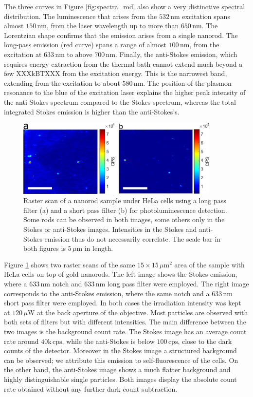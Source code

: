 \documentclass[journal=nalefd,manuscript=letter]{achemso}
\newcommand{\nm}{\ensuremath{\,\textrm{nm}}}
\newcommand{\um}{\ensuremath{\,\mu\textrm{m}}}
\newcommand{\uW}{\ensuremath{\,\mu\textrm{W}}}
\newcommand{\CPS}{\ensuremath{\,\textrm{cps}}}
\begin{document}
The three curves in Figure \ref{fig:spectra_rod} also show a very distinctive
spectral distribution. The luminescence that arises from the $532\nm$
excitation spans almost $150\nm$, from the laser wavelength up to
more than $650\nm$. The Lorentzian shape confirms that the emission arises from a single
nanorod. The long-pass emission (red curve) spans a range of
almost $100\nm$, from the excitation at $633\nm$ to above $700\nm$. Finally, the
anti-Stokes emission, which requires energy extraction from the thermal bath cannot extend much beyond a few XXXkBTXXX from the excitation energy.
This is the narrowest band, extending from the excitation to about $580\nm$.
The position of the plasmon resonance to the blue of the excitation laser explains the higher peak intensity of
the anti-Stokes spectrum compared to the Stokes spectrum, whereas the total integrated Stokes emission is higher than the anti-Stokes's. 

\begin{figure}[htp]
\centering
	\includegraphics[width=0.9\textwidth]{Figures/04_Stokes_AS/stokes_as_no_dye.png}
	\caption{Raster scan of a nanorod sample under HeLa cells using a long pass filter (a) and a short pass filter (b) for photoluminescence detection.
	Some rods can be observed in both images, some others only in the Stokes or anti-Stokes images. Intensities in the Stokes and anti-Stokes emission thus do not necessarily correlate. The
	scale bar in both figures is $5\um$ in length.}
	\label{fig:stokes_as_no_dye}
\end{figure}

Figure \ref{fig:stokes_as_no_dye} shows two raster scans of the same
$15\times15\um^2$ area of the sample with HeLa cells on top of gold nanorods.
The left image shows the Stokes emission, where a $633\nm$ notch and $633\nm$
long pass filter were employed. The right image corresponds to the anti-Stokes
emission, where the same notch and a $633\nm$ short pass filter were employed.
In both cases the irradiation intensity was kept at $120\uW$ at the back
aperture of the objective. Most particles are observed with both sets of
filters but with different intensities. The main difference between the two images is the background count rate.
The Stokes image has an average count rate around $40\textrm{k}\CPS$, while the
anti-Stokes is below $100\CPS$, close to the dark counts of the detector.
Moreover in the Stokes image a structured background can be observed; we
attribute this emission to self-fluorescence of the cells. On the other hand, the
anti-Stokes image shows a much flatter background and highly
distinguishable single particles. Both images display the absolute count rate
obtained without any further dark count subtraction.
\end{document}
